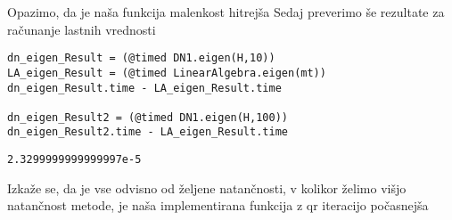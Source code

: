\documentclass[12pt,a4paper]{article}
\begin{document}
Opazimo, da je naša funkcija malenkost hitrejša Sedaj preverimo še rezultate za računanje lastnih vrednosti


\begin{verbatim}
dn_eigen_Result = (@timed DN1.eigen(H,10))
LA_eigen_Result = (@timed LinearAlgebra.eigen(mt))
dn_eigen_Result.time - LA_eigen_Result.time

dn_eigen_Result2 = (@timed DN1.eigen(H,100))
dn_eigen_Result2.time - LA_eigen_Result.time
\end{verbatim}
\begin{verbatim}
2.3299999999999997e-5
\end{verbatim}

Izkaže se, da je vse odvisno od željene natančnosti, v kolikor želimo višjo natančnost metode, je naša implementirana funkcija z qr iteracijo počasnejša
\end{document}
